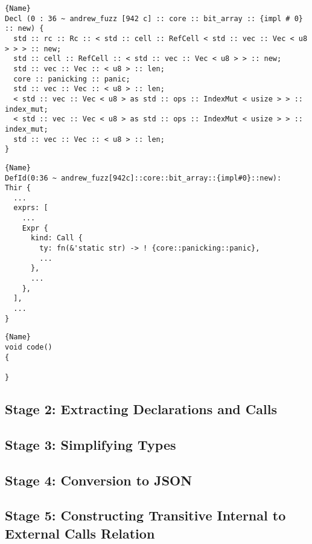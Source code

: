 \documentclass[11pt]{article}
\begin{document}
\begin{lstlisting}[caption=THIR-flat]{Name}
Decl (0 : 36 ~ andrew_fuzz [942 c] :: core :: bit_array :: {impl # 0} :: new) {
  std :: rc :: Rc :: < std :: cell :: RefCell < std :: vec :: Vec < u8 > > > :: new;
  std :: cell :: RefCell :: < std :: vec :: Vec < u8 > > :: new;
  std :: vec :: Vec :: < u8 > :: len;
  core :: panicking :: panic;
  std :: vec :: Vec :: < u8 > :: len;
  < std :: vec :: Vec < u8 > as std :: ops :: IndexMut < usize > > :: index_mut;
  < std :: vec :: Vec < u8 > as std :: ops :: IndexMut < usize > > :: index_mut;
  std :: vec :: Vec :: < u8 > :: len;
}
\end{lstlisting}

\noindent\begin{minipage}{.45\textwidth}
    \begin{lstlisting}[caption=code 1,frame=tlrb]{Name}
DefId(0:36 ~ andrew_fuzz[942c]::core::bit_array::{impl#0}::new):
Thir {
  ...
  exprs: [
    ...
    Expr {
      kind: Call {
        ty: fn(&'static str) -> ! {core::panicking::panic},
        ...
      },
      ...
    },
  ],
  ...
}
    \end{lstlisting}
\end{minipage}\hfill
\begin{minipage}{.45\textwidth}
    \begin{lstlisting}[caption=code 2,frame=tlrb]{Name}
void code()
{

}
    \end{lstlisting}
\end{minipage}

\subsection{Stage 2: Extracting Declarations and Calls}

\subsection{Stage 3: Simplifying Types}

\subsection{Stage 4: Conversion to JSON}

\subsection{Stage 5: Constructing Transitive Internal to External Calls Relation}
\end{document}
